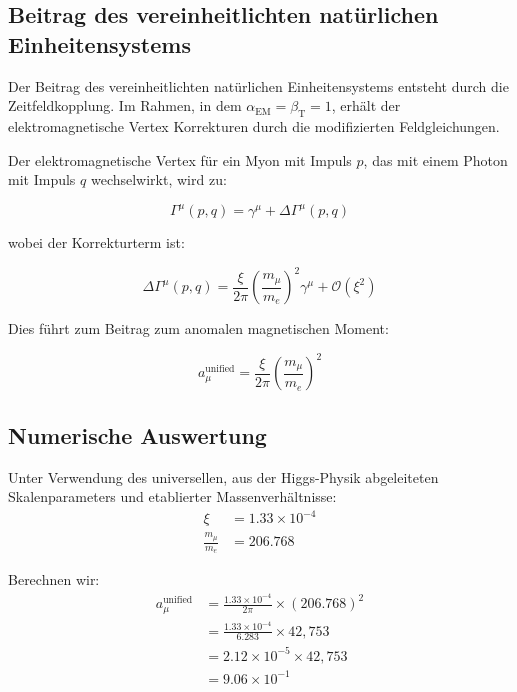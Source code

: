 \documentclass[12pt,a4paper]{article}
\newcommand{\alphaEM}{\alpha_{\text{EM}}}
\newcommand{\betaT}{\beta_{\text{T}}}
\newcommand{\xipar}{\xi}
\begin{document}
	\subsection{Beitrag des vereinheitlichten natürlichen Einheitensystems}
	
	Der Beitrag des vereinheitlichten natürlichen Einheitensystems entsteht durch die Zeitfeldkopplung. Im Rahmen, in dem $\alphaEM = \betaT = 1$, erhält der elektromagnetische Vertex Korrekturen durch die modifizierten Feldgleichungen.
	
	Der elektromagnetische Vertex für ein Myon mit Impuls $p$, das mit einem Photon mit Impuls $q$ wechselwirkt, wird zu:
	
	\begin{equation}
		\Gamma^{\mu}(p,q) = \gamma^{\mu} + \Delta\Gamma^{\mu}(p,q)
	\end{equation}
	
	wobei der Korrekturterm ist:
	
	\begin{equation}
		\Delta\Gamma^{\mu}(p,q) = \frac{\xipar}{2\pi}\left(\frac{m_\mu}{m_e}\right)^2\gamma^{\mu} + \mathcal{O}(\xipar^2)
	\end{equation}
	
	Dies führt zum Beitrag zum anomalen magnetischen Moment:
	
	\begin{equation}
		a_\mu^{\text{unified}} = \frac{\xipar}{2\pi}\left(\frac{m_\mu}{m_e}\right)^2
	\end{equation}
	
	\subsection{Numerische Auswertung}
	
	Unter Verwendung des universellen, aus der Higgs-Physik abgeleiteten Skalenparameters und etablierter Massenverhältnisse:
	\begin{align}
		\xipar &= 1.33 \times 10^{-4} \\
		\frac{m_\mu}{m_e} &= 206.768
	\end{align}
	
	Berechnen wir:
	\begin{align}
		a_\mu^{\text{unified}} &= \frac{1.33 \times 10^{-4}}{2\pi} \times (206.768)^2 \\
		&= \frac{1.33 \times 10^{-4}}{6.283} \times 42,753 \\
		&= 2.12 \times 10^{-5} \times 42,753 \\
		&= 9.06 \times 10^{-1}
	\end{align}
	
\end{document}
